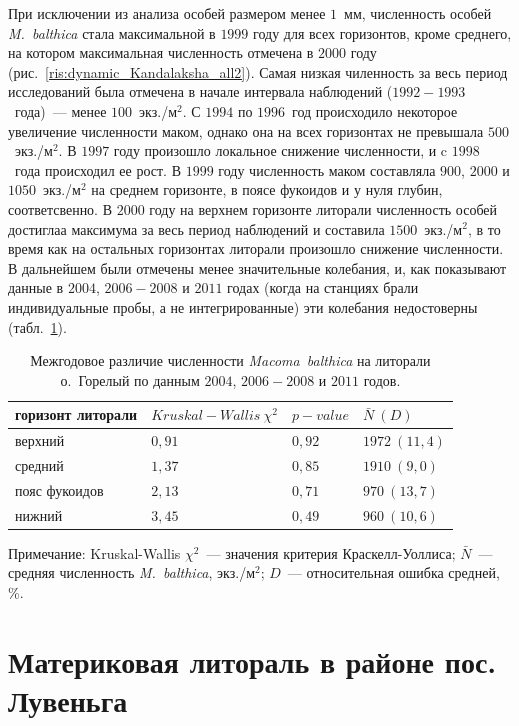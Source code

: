 При исключении из анализа особей размером менее $1$~мм, численность особей {\it M.~balthica} стала максимальной в $1999$ году для всех горизонтов, кроме среднего, на котором максимальная численность отмечена в $2000$ году (рис.~\ref{ris:dynamic_Kandalaksha_all2}).
Самая низкая чиленность за весь период исследований была отмечена в начале интервала наблюдений ($1992-1993$~года)~--- менее $100$~экз./м$^2$.
С $1994$ по $1996$~год происходило некоторое увеличение численности маком, однако она на всех горизонтах не превышала $500$~экз./м$^2$.
В $1997$ году произошло локальное снижение численности, и c $1998$~года происходил ее рост. 
В $1999$ году численность маком составляла $900$, $2000$ и $1050$~экз./м$^2$ на среднем горизонте, в поясе фукоидов и у нуля глубин, соответсвенно.
В $2000$ году на верхнем горизонте литорали численность особей достиглаа максимума за весь период наблюдений и составила  $1500$~экз./м$^2$, в то время как на остальных горизонтах литорали произошло снижение численности.
В дальнейшем были отмечены менее значительные колебания, и, как показывают данные в $2004$, $2006 - 2008$ и $2011$ годах (когда на станциях брали индивидуальные пробы, а не интегрированные) эти колебания недостоверны (табл.~\ref{tab:Goreliy_N2_Kruskal}).

	\begin{table}[p]
	\caption{Межгодовое различие численности {\it Macoma~balthica} на литорали о.~Горелый по данным $2004$, $2006 - 2008$ и $2011$ годов.}
	\label{tab:Goreliy_N2_Kruskal}
	\begin{tabularx}{\textwidth}{|*{4}{X|}} \hline
	горизонт литорали & $Kruskal-Wallis\ \chi^2$ & $p-value$ & $\bar{N} ~ (D)$ \\ 
	\hline
	верхний & $0,91$ & $0,92$ & $1972~(11,4)$ \\
	\hline
	средний & $1,37$ & $0,85$ & $1910~(9,0)$\\
	\hline
	пояс фукоидов & $2,13$ & $0,71$ & $970~(13,7)$ \\
	\hline
	нижний & $3,45$ & $0,49$ & $960~(10,6)$ \\
	\hline
	\end{tabularx}
	{\footnotesize Примечание: Kruskal-Wallis $\chi^2$~--- значения критерия Краскелл-Уоллиса; $\bar{N}$~--- средняя численность {\it 	M.~balthica}, экз./м$^2$; $D$~--- относительная ошибка средней, \%.}
	\end{table}


		\section{Материковая литораль в районе пос. Лувеньга}

